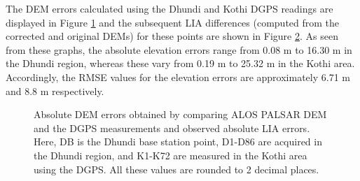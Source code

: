 \documentclass[12pt]{elsarticle}
\numberwithin{equation}{section}
\numberwithin{figure}{section}
\numberwithin{table}{section}
\begin{document}
The DEM errors calculated using the Dhundi and Kothi DGPS readings are displayed in Figure \ref{subfig:dem_error} and the subsequent LIA differences (computed from the corrected and original DEMs) for these points are shown in Figure \ref{subfig:lia_error}. As seen from these graphs, the absolute elevation errors range from 0.08 m to 16.30 m in the Dhundi region, whereas these vary from 0.19 m to 25.32 m in the Kothi area. Accordingly, the RMSE values for the elevation errors are approximately 6.71 m and 8.8 m respectively.

\begin{figure}[!ht]
    \centering
    \begin{subfigure}[t]{\textwidth}
        \caption{}
        \label{subfig:dem_error}
    \end{subfigure}
    \begin{subfigure}[t]{\textwidth}
        \caption{}
        \label{subfig:lia_error}
    \end{subfigure}
    \caption{ Absolute DEM errors obtained by comparing ALOS PALSAR DEM and the DGPS measurements and  observed absolute LIA errors. Here, DB is the Dhundi base station point, D1-D86 are acquired in the Dhundi region, and K1-K72 are measured in the Kothi area using the DGPS. All these values are rounded to 2 decimal places.}
    \label{fig:error}
\end{figure}
\end{document}
